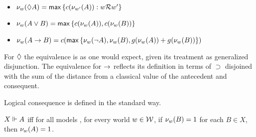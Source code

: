 \begin{itemize}
	\item $ \mathcal{\nu}_{ w }({ \Diamond A })		= \mathsf{max}\left\{{ c( \mathcal{\nu}_{ w' }({ A }) ):  { w } \mathcal{R} { w' }  }\right\} $
	\item $ \mathcal{\nu}_{ w }({ A \vee B }) 		= \mathsf{max}\left\{{ c( \mathcal{\nu}_{ w }({ A }) ), c( \mathcal{\nu}_{ w }({ B }) ) }\right\} $
	\item $ \mathcal{\nu}_{ w }({ A \rightarrow B }) = c( \mathsf{max}\left\{{ \mathcal{\nu}_{ w }({ \neg A }), \mathcal{\nu}_{ w }({ B }), g( \mathcal{\nu}_{ w }({ A }) ) + g( \mathcal{\nu}_{ w }({ B }) ) }\right\} ) $
\end{itemize}
\noindent For $\Diamond$ the equivalence is as one would expect, given its treatment as generalized disjunction. The equivalence for $\rightarrow$ reflects its definition in terms of $\supset$ disjoined with the sum of the distance from a classical value of the antecedent and consequent. 

Logical consequence is defined in the standard way.

\begin{definition}\label{implDef}
$ { X }\Vdash{ A } $ iff for all models \Model, for every world $ w \in \mathcal{W} $, if $ \mathcal{\nu}_{ w }({ B }) = 1 $ for each $ B \in X $, then $ \mathcal{\nu}_{ w }({ A }) = 1 $.
\end{definition}

